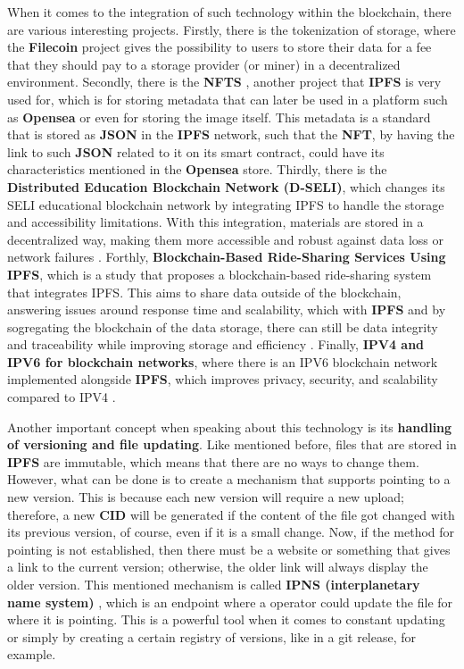 When it comes to the integration of such technology within the blockchain, there are various interesting projects. Firstly, there is the tokenization of storage, where the \textbf{Filecoin} \cite{filecoin} project gives the possibility to users to store their data for a fee that they should pay to a storage provider (or miner) in a decentralized environment. Secondly, there is the \textbf{NFTS} \cite{nfts}, another project that \textbf{IPFS} is very used for, which is for storing metadata that can later be used in a platform such as \textbf{Opensea} \cite{opensea} or even for storing the image itself. This metadata is a standard that is stored as \textbf{JSON} \cite{json} in the \textbf{IPFS} network, such that the \textbf{NFT}, by having the link to such \textbf{JSON} related to it on its smart contract, could have its characteristics mentioned in the \textbf{Opensea} store. Thirdly, there is the \textbf{Distributed Education Blockchain Network (D-SELI)}, which changes its SELI educational blockchain network by integrating IPFS to handle the storage and accessibility limitations. With this integration, materials are stored in a decentralized way, making them more accessible and robust against data loss or network failures \cite{ipfs-educational-platform}. Forthly, \textbf{Blockchain-Based Ride-Sharing Services Using IPFS}, which is a study that proposes a blockchain-based ride-sharing system that integrates IPFS. This aims to share data outside of the blockchain, answering issues around response time and scalability, which with \textbf{IPFS} and by sogregating the blockchain of the data storage, there can still be data integrity and traceability while improving storage and efficiency \cite{ipfs-sogregate-blockchain-from-storage}. Finally, \textbf{IPV4 and IPV6 for blockchain networks}, where there is an IPV6 blockchain network implemented alongside \textbf{IPFS}, which improves privacy, security, and scalability compared to IPV4 \cite{ipv6-blockchain-networks}.

Another important concept when speaking about this technology is its \textbf{handling of versioning and file updating}. Like mentioned before, files that are stored in \textbf{IPFS} are immutable, which means that there are no ways to change them. However, what can be done is to create a mechanism that supports pointing to a new version. This is because each new version will require a new upload; therefore, a new \textbf{CID} will be generated if the content of the file got changed with its previous version, of course, even if it is a small change. Now, if the method for pointing is not established, then there must be a website or something that gives a link to the current version; otherwise, the older link will always display the older version. This mentioned mechanism is called \textbf{IPNS (interplanetary name system)} \cite{ipfs_ipns_reference}, which is an endpoint where a operator could update the file for where it is pointing. This is a powerful tool when it comes to constant updating or simply by creating a certain registry of versions, like in a git release, for example.

